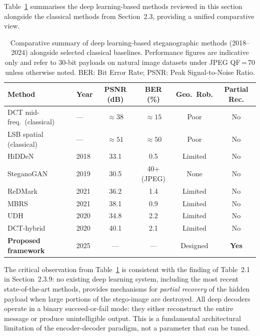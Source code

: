 \documentclass[12pt,a4paper,oneside]{report}
\begin{document}
	Table~\ref{tab:dl_comparison} summarises the deep learning-based methods reviewed in this
	section alongside the classical methods from Section~2.3, providing a unified comparative view.
	
	\begin{table}[htbp]
		\centering
		\caption{Comparative summary of deep learning-based steganographic methods (2018--2024)
			alongside selected classical baselines. Performance figures are indicative only
			and refer to $30$-bit payloads on natural image datasets under JPEG QF\,=\,70 unless
			otherwise noted. BER: Bit Error Rate; PSNR: Peak Signal-to-Noise Ratio.}
		\label{tab:dl_comparison}
		\small
		\renewcommand{\arraystretch}{1.3}
		\begin{tabular}{@{} l l c c c c @{}}
			\toprule
			\textbf{Method} & \textbf{Year} & \textbf{PSNR (dB)} & \textbf{BER (\%)} &
			\textbf{Geo.\ Rob.} & \textbf{Partial Rec.} \\
			\midrule
			DCT mid-freq.\ (classical) & ---  & $\approx\!38$ & $\approx\!15$ & Poor & No \\
			LSB spatial (classical)    & ---  & $\approx\!51$ & $\approx\!50$ & Poor & No \\
			\midrule
			HiDDeN \cite{zhu2018hidden}         & 2018 & 33.1 & 0.5  & Limited & No \\
			SteganoGAN \cite{zhang2019steganogan}& 2019 & 30.5 & 40+ (JPEG) & None & No \\
			ReDMark \cite{das2021redmark}        & 2021 & 36.2 & 1.4  & Limited & No \\
			MBRS \cite{jia2021mbrs}             & 2021 & 38.1 & 0.9  & Limited & No \\
			UDH \cite{zhang2020udh}             & 2020 & 34.8 & 2.2  & Limited & No \\
			DCT-hybrid \cite{ahmadi2020redmark} & 2020 & 40.1 & 2.1  & Limited & No \\
			\midrule
			\textbf{Proposed framework}         & 2025 & ---  & ---  & Designed & \textbf{Yes} \\
			\bottomrule
		\end{tabular}
	\end{table}
	
	The critical observation from Table~\ref{tab:dl_comparison} is consistent with the finding of
	Table~2.1 in Section~2.3.9: no existing deep learning system, including the most recent
	state-of-the-art methods, provides mechanisms for \emph{partial recovery} of the hidden payload
	when large portions of the stego-image are destroyed. All deep decoders operate in a binary
	succeed-or-fail mode: they either reconstruct the entire message or produce unintelligible output.
	This is a fundamental architectural limitation of the encoder-decoder paradigm, not a parameter
	that can be tuned.
	
\end{document}

